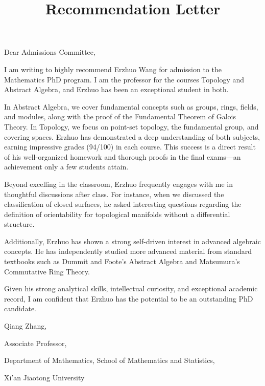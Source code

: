 \documentclass[12pt]{article}
\title{Recommendation Letter}
\theoremstyle{definition}
\begin{document}
\maketitle
Dear Admissions Committee,

I am writing to highly recommend Erzhuo Wang for admission to the Mathematics PhD program. I am the professor for the courses Topology and Abstract Algebra, and Erzhuo has been an exceptional student in both.

In Abstract Algebra, we cover fundamental concepts such as groups, rings, fields, and modules, along with the proof of the Fundamental Theorem of Galois Theory. In Topology, we focus on point-set topology, the fundamental group, and covering spaces. Erzhuo has demonstrated a deep understanding of both subjects, earning impressive grades (94/100) in each course. This success is a direct result of his well-organized homework and thorough proofs in the final exams—an achievement only a few students attain.

Beyond excelling in the classroom, Erzhuo frequently engages with me in thoughtful discussions after class. For instance, 
when we discussed the classification of closed surfaces, he asked interesting questions regarding the definition of orientability for topological manifolds without a differential structure. 

Additionally, Erzhuo has shown a strong self-driven interest in advanced algebraic concepts. He has independently studied more advanced material from standard textbooks such as 
Dummit and Foote's Abstract Algebra and Matsumura's Commutative Ring Theory.

Given his strong analytical skills, intellectual curiosity, and exceptional academic record, I am confident that Erzhuo has the potential to be an outstanding PhD candidate.

\vskip 1cm
\noindent Qiang Zhang,\par
\noindent Associate Professor, \par
\noindent Department of Mathematics, School of Mathematics and Statistics, \par
\noindent Xi'an Jiaotong University
\end{document}
